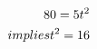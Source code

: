 \documentclass[preview]{standalone}
\begin{document}
\begin{align*}
\special{dvisvgm:raw <g id='unique000'>}80 = 5t^2 \\implies t^2 = 16\special{dvisvgm:raw </g>}
\end{align*}
\end{document}
